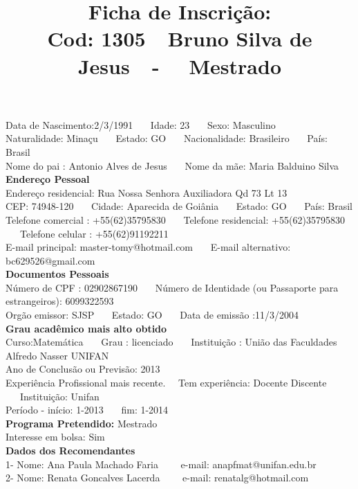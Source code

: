 \documentclass[11pt]{article}
\title{\vspace*{-4cm} Ficha de Inscrição: \\Cod: 1305\ \ Bruno Silva de Jesus\ \ - \ \ Mestrado 
 }
\date{}
\begin{document}
\maketitle
\vspace*{-1.5cm}
\noindent Data de Nascimento:2/3/1991
\ \ \ Idade: 23   \ \ \ Sexo: Masculino
\\
Naturalidade: Minaçu  
\ \ \  Estado: GO
\ \ \  Nacionalidade: Brasileiro
\ \ \ País: Brasil
\\        
Nome do pai : Antonio Alves de Jesus
\ \ \ Nome da mãe: Maria Balduino Silva          
\\[0.2cm]                     
\textbf{Endereço Pessoal} 
\\ 
\noindent Endereço residencial: Rua Nossa Senhora Auxiliadora Qd 73 Lt 13
\\
        CEP: 74948-120 
\ \ \ Cidade: Aparecida de Goiânia 
\ \ \ Estado: GO 
\ \ \ País: Brasil
\\		
		Telefone comercial : +55(62)35795830
\ \ \ Telefone residencial: +55(62)35795830
\ \ \ Telefone celular : +55(62)91192211
\\
E-mail principal: master-tomy@hotmail.com
\ \ \ E-mail alternativo: bc629526@gmail.com 
\\[0.2cm] 
\textbf{Documentos Pessoais}
\\
\noindent Número de CPF : 02902867190
\ \ \ Número de Identidade (ou Passaporte para estrangeiros): 6099322593
\\
Orgão emissor: SJSP
\ \ \ Estado: GO
\ \ \ Data de emissão :11/3/2004
\\[0.3cm]
\textbf{Grau acadêmico mais alto obtido}
\\	
Curso:Matemática
\ \ \ Grau : licenciado
\ \ \ Instituição : União das Faculdades Alfredo Nasser UNIFAN
\\			
Ano de Conclusão ou Previsão: 2013
\\ 
Experiência Profissional mais recente. \ \  
Tem experiência: Docente Discente  
\ \ \ Instituição: Unifan
\\  
Período - início: 1-2013
\ \ \ fim: 1-2014
\\[0.2cm] 
\textbf{Programa Pretendido:} Mestrado\\
Interesse em bolsa: Sim
\\[0.3cm]		
\textbf{Dados dos Recomendantes} 
\\
1- Nome: Ana Paula Machado Faria
\ \ \ \  e-mail: anapfmat@unifan.edu.br 
\\
2- Nome: Renata Goncalves Lacerda
\ \ \ \ e-mail: renatalg@hotmail.com
\end{document}
